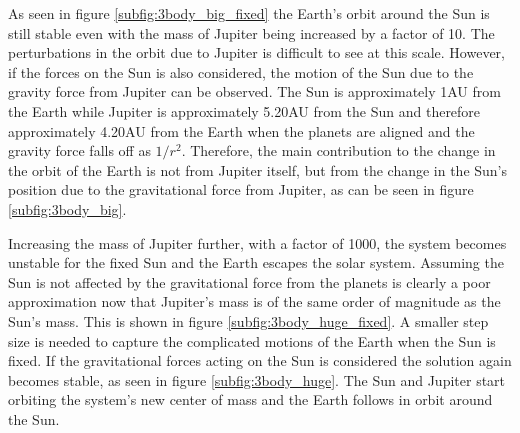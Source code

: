 \documentclass{article}
\begin{document}
As seen in figure \ref{subfig:3body_big_fixed} the Earth's orbit around the Sun is still stable even with the mass of Jupiter being increased by a factor of 10. The perturbations in the orbit due to Jupiter is difficult to see at this scale. However, if the forces on the Sun is also considered, the motion of the Sun due to the gravity force from Jupiter can be observed. The Sun is approximately 1AU from the Earth while Jupiter is approximately 5.20AU from the Sun and therefore approximately 4.20AU from the Earth when the planets are aligned and the gravity force falls off as $1/r^2$. Therefore, the main contribution to the change in the orbit of the Earth is not from Jupiter itself, but from the change in the Sun's position due to the gravitational force from Jupiter, as can be seen in figure \ref{subfig:3body_big}. 

Increasing the mass of Jupiter further, with a factor of 1000, the system becomes unstable for the fixed Sun and the Earth escapes the solar system. Assuming the Sun is not affected by the gravitational force from the planets is clearly a poor approximation now that Jupiter's mass is of the same order of magnitude as the Sun's mass. This is shown in figure \ref{subfig:3body_huge_fixed}. A smaller step size is needed to capture the complicated motions of the Earth when the Sun is fixed. If the gravitational forces acting on the Sun is considered the solution again becomes stable, as seen in figure \ref{subfig:3body_huge}. The Sun and Jupiter start orbiting the system's new center of mass and the Earth follows in orbit around the Sun.
\end{document}
